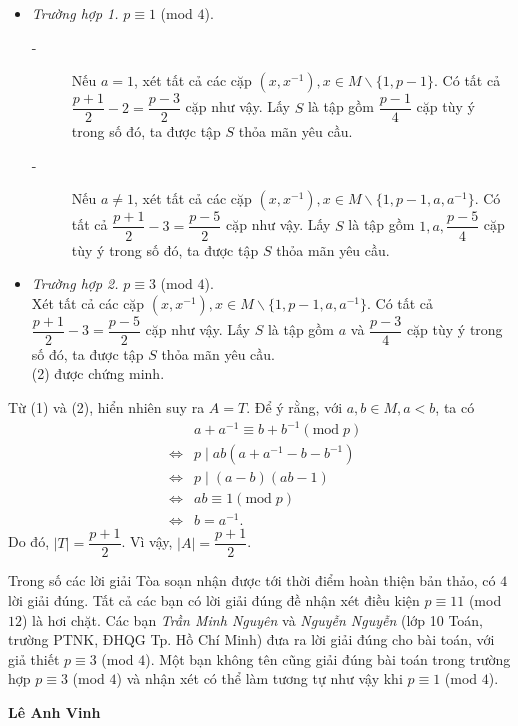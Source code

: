 \begin{bt}
{\begin{itemize}
\item \textit{Trường hợp 1.} $p \equiv 1$ (mod $4$).
\begin{description}
\item[-] Nếu $a=1$, xét tất cả các cặp $(x,x^{-1}), x\in M \backslash \{1,p-1\}$. Có tất cả $\dfrac{p+1}{2}-2=\dfrac{p-3}{2}$ cặp như vậy. Lấy $S$ là tập gồm $\dfrac{p-1}{4}$ cặp tùy ý trong số đó, ta được tập $S$ thỏa mãn yêu cầu.
\item[-] Nếu $a \ne 1$, xét tất cả các cặp $(x,x^{-1}), x\in M \backslash \{1,p-1, a, a^{-1}\}$. Có tất cả $\dfrac{p+1}{2}-3=\dfrac{p-5}{2}$ cặp như vậy. Lấy $S$ là tập gồm $1,a, \dfrac{p-5}{4}$ cặp tùy ý trong số đó, ta được tập $S$ thỏa mãn yêu cầu.
\end{description}
\item \textit{Trường hợp 2.} $p \equiv 3$ (mod $4$).\\
Xét tất cả các cặp $(x,x^{-1}), x\in M \backslash \{1,p-1, a, a^{-1}\}$. Có tất cả $\dfrac{p+1}{2}-3=\dfrac{p-5}{2}$ cặp như vậy. Lấy $S$ là tập gồm $a$ và $ \dfrac{p-3}{4}$ cặp tùy ý trong số đó, ta được tập $S$ thỏa mãn yêu cầu.\\
(2) được chứng minh.
\end{itemize}
Từ (1) và (2), hiển nhiên suy ra $A=T$. Để ý rằng, với $a, b\in M, a<b$, ta có
{\allowdisplaybreaks
\begin{eqnarray*}
&&a+a^{-1} \equiv b+b^{-1} (\text{mod}\; p)\\ 
& \Leftrightarrow &p \mid ab(a+a^{-1}-b-b^{-1})\\
& \Leftrightarrow &p \mid (a-b)(ab-1)\\
& \Leftrightarrow &ab \equiv 1 (\text{mod}\; p)\\
& \Leftrightarrow &b=a^{-1}.
\end{eqnarray*}}Do đó, $|T|=\dfrac{p+1}{2}$. Vì vậy, $|A|=\dfrac{p+1}{2}$.
\begin{nx}
Trong số các lời giải Tòa soạn nhận được tới thời điểm hoàn thiện bản thảo, có $4$ lời giải đúng. Tất cả các bạn có lời giải đúng đề nhận xét điều kiện $p \equiv 11$ (mod $12$) là hơi chặt. Các bạn \textit{Trần Minh Nguyên} và \textit{Nguyễn Nguyễn } (lớp 10 Toán, trường PTNK, ĐHQG Tp. Hồ Chí Minh) đưa ra lời giải đúng cho bài toán, với giả thiết $p \equiv 3$  (mod $4$). Một bạn không tên cũng giải đúng bài toán trong trường hợp $p \equiv 3$ (mod $4$) và nhận xét có thể làm tương tự như vậy khi $p \equiv 1$ (mod $4$).
\end{nx}
\begin{flushright}
\textbf{Lê Anh Vinh}
\end{flushright}
}
\end{bt}

